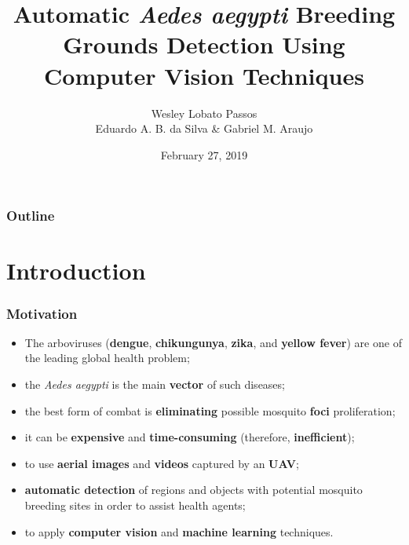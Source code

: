 \documentclass{beamer}
\title[Wesley L. Passos]{{\huge {Automatic {\it Aedes aegypti} Breeding Grounds Detection Using Computer Vision Techniques} }
	}
\author[]{
	Wesley Lobato Passos\\
	\vspace{5mm}
	\footnotesize{Eduardo A. B. da Silva \&
	Gabriel M. Araujo}
}
\institute[SMT/COPPE/UFRJ]
{
	Signals, Multimedia, and Telecommunications Laboratory \newline
	COPPE/UFRJ
}
\date{February 27, 2019}
\begin{document}
  \MyLogos{0.60cm}

  \begin{frame}
    \titlepage
  \end{frame}

  \MyLogos{0.30cm}

  \begin{frame}
    \frametitle{Outline}
    \tableofcontents[hideallsubsections]
  \end{frame}



	\section{Introduction}

		\begin{frame}\frametitle{Motivation}

			\begin{itemize}
				\item The arboviruses ({\bf dengue}, {\bf chikungunya}, {\bf zika}, and {\bf yellow fever})
				are one of the leading global health problem;
				\item the {\it Aedes aegypti} is the main {\bf vector} of such diseases;
				\item the best form of combat is {\bf eliminating} possible mosquito {\bf foci} proliferation;
				\item it can be {\bf expensive} and {\bf time-consuming} (therefore, {\bf inefficient});
				\item to use {\bf aerial images} and {\bf videos} captured by an {\bf UAV};
				\item {\bf automatic detection} of regions and objects with {potential mosquito breeding sites} in order to assist health agents;
				\item to apply {\bf computer vision} and {\bf machine learning} techniques.
		\end{itemize}

	\end{frame}


\end{document}
